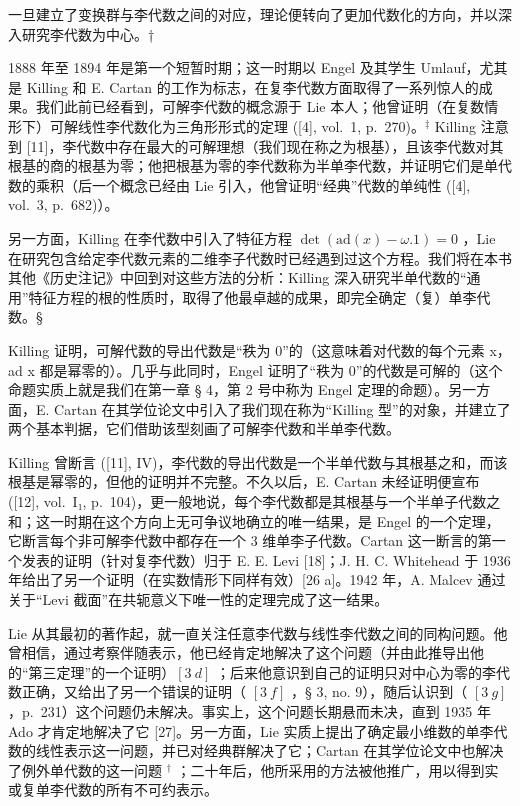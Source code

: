 
一旦建立了变换群与李代数之间的对应，理论便转向了更加代数化的方向，并以深入研究李代数为中心。†

1888 年至 1894 年是第一个短暂时期；这一时期以 Engel 及其学生 Umlauf，尤其是 Killing 和 E. Cartan 的工作为标志，在复李代数方面取得了一系列惊人的成果。我们此前已经看到，可解李代数的概念源于 Lie 本人；他曾证明（在复数情形下）可解线性李代数化为三角形形式的定理 ({[}4{]}, vol.~1, p.~270)。\(^{\ddagger}\) Killing 注意到 {[}11{]}，李代数中存在最大的可解理想（我们现在称之为根基），且该李代数对其根基的商的根基为零；他把根基为零的李代数称为半单李代数，并证明它们是单代数的乘积（后一个概念已经由 Lie 引入，他曾证明“经典”代数的单纯性 ({[}4{]}, vol.~3, p.~682)）。

另一方面，Killing 在李代数中引入了特征方程 \(\det(\mathrm{ad}(x)-\omega.1)=0\) ，Lie 在研究包含给定李代数元素的二维李子代数时已经遇到过这个方程。我们将在本书其他《历史注记》中回到对这些方法的分析：Killing 深入研究半单代数的“通用”特征方程的根的性质时，取得了他最卓越的成果，即完全确定（复）单李代数。§

Killing 证明，可解代数的导出代数是“秩为 0”的（这意味着对代数的每个元素 x，ad x 都是幂零的）。几乎与此同时，Engel 证明了“秩为 0”的代数是可解的（这个命题实质上就是我们在第一章 § 4，第 2 号中称为 Engel 定理的命题）。另一方面，E. Cartan 在其学位论文中引入了我们现在称为“Killing 型”的对象，并建立了两个基本判据，它们借助该型刻画了可解李代数和半单李代数。

Killing 曾断言 ({[}11{]}, IV)，李代数的导出代数是一个半单代数与其根基之和，而该根基是幂零的，但他的证明并不完整。不久以后，E. Cartan 未经证明便宣布 ({[}12{]}, vol.~I₁, p.~104)，更一般地说，每个李代数都是其根基与一个半单子代数之和；这一时期在这个方向上无可争议地确立的唯一结果，是 Engel 的一个定理，它断言每个非可解李代数中都存在一个 3 维单李子代数。Cartan 这一断言的第一个发表的证明（针对复李代数）归于 E. E. Levi {[}18{]}；J. H. C. Whitehead 于 1936 年给出了另一个证明（在实数情形下同样有效）{[}26 a{]}。1942 年，A. Malcev 通过关于“Levi 截面”在共轭意义下唯一性的定理完成了这一结果。

Lie 从其最初的著作起，就一直关注任意李代数与线性李代数之间的同构问题。他曾相信，通过考察伴随表示，他已经肯定地解决了这个问题（并由此推导出他的“第三定理”的一个证明）\([3\ d]\) ；后来他意识到自己的证明只对中心为零的李代数正确，又给出了另一个错误的证明（ \([3\ f]\) ，§ 3, no. 9），随后认识到（ \([3\ g]\) ，p.~231）这个问题仍未解决。事实上，这个问题长期悬而未决，直到 1935 年 Ado 才肯定地解决了它 {[}27{]}。另一方面，Lie 实质上提出了确定最小维数的单李代数的线性表示这一问题，并已对经典群解决了它；Cartan 在其学位论文中也解决了例外单代数的这一问题 \(^{\dagger}\) ；二十年后，他所采用的方法被他推广，用以得到实或复单李代数的所有不可约表示。

